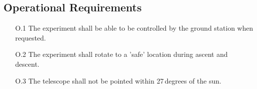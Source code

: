 \subsection{Operational Requirements}

\begin{enumerate}[topsep=0pt,itemsep=-1ex,partopsep=1ex,parsep=1ex]
    \item[O.1] The experiment shall be able to be controlled by the ground station when requested.
    \item[O.2] The experiment shall rotate to a 'safe' location during ascent and descent.
    \item[O.3] The telescope shall not be pointed within 27\,degrees of the sun.
\end{enumerate}